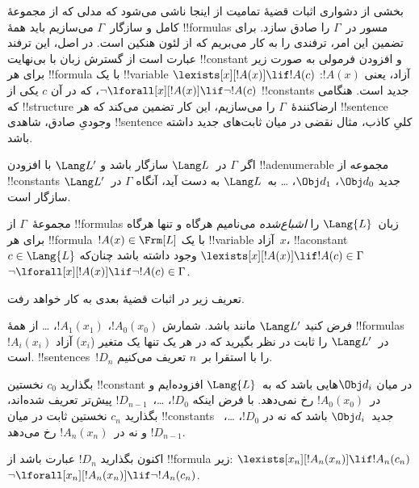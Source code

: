\documentclass[../../../include/open-logic-section]{subfiles}
\begin{document}


\begin{explain}
بخشی از دشواری اثبات قضیهٔ تمامیت از اینجا ناشی می‌شود که مدلی که از
مجموعهٔ کامل و سازگار~$\Gamma$ می‌سازیم باید همهٔ !!{formula}s مسور
در~$\Gamma$ را صادق سازد. برای تضمین این امر، ترفندی را به کار می‌بریم
که از لئون هنکین است. در اصل، این ترفند عبارت است از گسترش زبان با
بی‌نهایت !!{constant} و افزودن فرمولی به صورت زیر برای هر !!{formula}
با یک !!{variable} آزاد، یعنی $!A(x)$:
      {$\lexists[x][!A(x)] \lif !A(c)$}
      {$\lnot\lforall[x][!A(x)] \lif \lnot !A(c)$}،
که در آن $c$ یکی از !!{constant}s جدید است. هنگامی که
!!{structure} ارضاکنندهٔ~$\Gamma$ را می‌سازیم، این کار تضمین می‌کند که
هر
{!!{sentence} وجودیِ صادق، شاهدی}
{!!{sentence} کلیِ کاذب، مثال نقضی}
در میان ثابت‌های جدید داشته باشد.
\end{explain}

\begin{prop}
اگر $\Gamma$ در~$\Lang L$ سازگار باشد و $\Lang L'$ با افزودن
!!a{denumerable} مجموعه از !!{constant}s جدید $\Obj d_0$،
$\Obj d_1$، \dots{} به~$\Lang L$ به دست آید، آنگاه $\Gamma$
در~$\Lang L'$ سازگار است.
\end{prop}

\begin{defn}
مجموعهٔ~$\Gamma$ از !!{formula}s زبان~$\Lang {L}$ را
\emph{اشباع‌شده} می‌نامیم هرگاه و تنها هرگاه برای هر
!!{formula}~$!A(x) \in \Frm[L]$ با یک !!{variable} آزاد~$x$،
!!a{constant}~$c \in \Lang{L}$ وجود داشته باشد چنان‌که
      {$\lexists[x][!A(x)] \lif !A(c) \in \Gamma$}
      {$\lnot\lforall[x][!A(x)] \lif \lnot !A(c) \in \Gamma$}.
\end{defn}

تعریف زیر در اثبات قضیهٔ بعدی به کار خواهد رفت.

\begin{defn}
فرض کنید $\Lang L'$ مانند  باشد. شمارش
$!A_0(x_0)$، $!A_1(x_1)$، \dots{} از همهٔ !!{formula}s~$!A_i(x_i)$
در~$\Lang L'$ را ثابت در نظر بگیرید که در هر یک تنها یک متغیر
($x_i$) آزاد است. !!{sentence}s~$!D_n$ را با استقرا بر~$n$ تعریف
می‌کنیم.

بگذارید $c_0$ نخستین !!{constant} در میان $\Obj d_i$هایی باشد که
به~$\Lang{L}$ افزوده‌ایم و در~$!A_0(x_0)$ رخ نمی‌دهد. با فرض اینکه
$!D_0$، \dots،~$!D_{n-1}$ پیش‌تر تعریف شده‌اند، بگذارید $c_n$ نخستین
ثابت در میان !!{constant}s جدید~$\Obj d_i$ باشد که نه در
$!D_0$، \dots،~$!D_{n-1}$ و نه در~$!A_n(x_n)$ رخ می‌دهد.

اکنون بگذارید $!D_{n}$ عبارت باشد از !!{formula} زیر: 
{$\lexists[x_{n}][!A_{n}(x_{n})] \lif
  !A_{n}(c_{n})$}{$\lnot\lforall[x_{n}][!A_{n}(x_{n})] \lif \lnot
  !A_{n}(c_{n})$}.
\end{defn}
\end{document}
